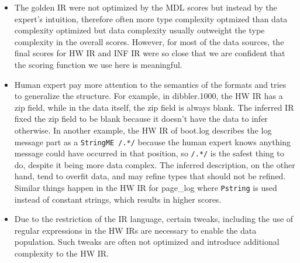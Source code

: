 \begin{itemize}
\item The golden IR were not optimized by the MDL scores but instead
by the expert's intuition, therefore often more type complexity optmized than
data complexity optimized but data complexity usually outweight the type
complexity in the overall scores.
However, for most of the data sources, the final scores for HW IR and INF IR were so close 
that we are confident that the scoring function we use here is meaningful.

\item Human expert pay more attention to the semantics of the formats and 
tries to generalize the structure. For example, in dibbler.1000, the
HW IR has a zip field, while in the data itself, the zip field is always
blank. The inferred IR fixed the zip field to be
blank because it doesn't have the data to infer otherwise. 
In another example, the HW IR of boot.log describes the log message part 
as a \verb#StringME /.*/# because the human expert knows anything
message could have occurred in that position, so \verb#/.*/# is the safest thing
to do, despite it being more data complex. 
The inferred description, on the other hand, tend to overfit data,
and may refine types that should not be refined. Similar things happen
in the HW IR for page\_log where {\tt Pstring} is used instead of constant strings, 
which results in higher scores.

\item Due to the restriction of the IR language, certain tweaks, including the
use of regular expressions in the HW IRs are necessary to enable
the data population. Such tweaks are often not optimized and introduce
additional complexity to the HW IR. 
\end{itemize}


